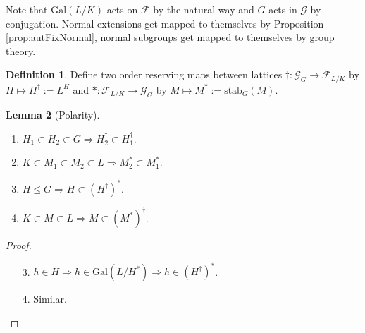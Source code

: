 \documentclass[a4paper]{article}
\newcommand{\stab}{\text{stab}}
\newcommand{\gal}{\text{Gal}}
\theoremstyle{definition}
\newtheorem{defn}{Definition}[subsection]
\newtheorem{lemma}[defn]{Lemma}
\begin{document}
Note that $\gal(L/K)$ acts on $\mathcal F$ by the natural way and $G$ acts in $\mathcal G$ by conjugation. Normal extensions get mapped to themselves by Proposition \ref{prop:autFixNormal}, normal subgroups get mapped to themselves by group theory.

\begin{defn}
Define two order reserving maps between lattices $\dagger:\mathcal G_G\rightarrow \mathcal F_{L/K}$ by $H\mapsto H^\dagger:=L^H$ and $\ast:\mathcal F_{L/K}\rightarrow \mathcal G_G$ by $M\mapsto M^\ast:=\stab_G(M)$.
\end{defn}

\begin{lemma}[Polarity]
\begin{enumerate}
\item $H_1\subset H_2\subset G \Rightarrow H_2^\dagger \subset H_1^\dagger$.
\item $K\subset M_1\subset M_2\subset L\Rightarrow M_2^\ast\subset M_1^\ast$.
\item $H\leq G\Rightarrow H\subset \left(H^\dagger\right)^\ast$.
\item $K\subset M\subset L\Rightarrow M\subset \left(M^\ast\right)^\dagger$.
\end{enumerate}
\end{lemma}

\begin{proof}
\begin{enumerate}
\item[3.] $h\in H\Rightarrow h\in\gal(L/H^\ast)\Rightarrow h\in \left(H^\dagger\right)^\ast$.
\item[4.] Similar.
\end{enumerate}
\end{proof}
\end{document}
